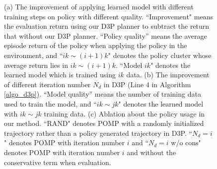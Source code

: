 \documentclass{article}
\newcommand{\yue}[1]{ {#1}}
\begin{document}
\begin{figure}
    \centering
    \begin{minipage}{0.32\linewidth}
    \end{minipage}
    \begin{minipage}{0.32\linewidth}
    \end{minipage}
        \begin{minipage}{0.32\linewidth}
    \end{minipage}
    \caption{{ (a) The improvement of applying learned model with different training steps on policy with different quality. \yue{``Improvement" means the evaluation return using our D3P planner to subtract the return that without our D3P planner.  ``Policy quality” means the average episode return of the policy when applying the policy in the environment, and ``$ik{\sim}(i+1)k$" denotes the policy cluster whose average return lies in $ik{\sim}(i+1)k$. } ``Model $ik$" denotes the learned model which is trained using $ik$ data. (b) The improvement of different iteration number $N_d$ in D3P (Line 4 in Algorithm \ref{algo_d3p}). \yue{``Model quality” means the number of training data used to train the model, and ``$ik{\sim}jk$" denotes the learned model with  $ik{\sim}jk$ training data.} (c) Ablation  about the policy usage in our method. ``RAND" denotes POMP with a randomly initialized trajectory rather than a policy generated trajectory in D3P. ``$N_d=i$" denotes POMP with iteration number $i$ and ``$N_d=i$ w/o cons" denotes POMP with iteration number $i$  and without the conservative term when evaluation. }} 
    \label{fig:abquality}

\end{figure}
\end{document}
